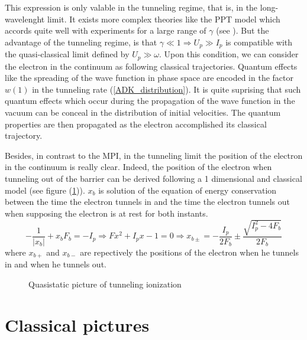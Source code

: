 \documentclass[a4paper]{article}
\begin{document}
\par
This expression is only valable in the tunneling regime, that is, in the long-wavelenght limit. It exists more complex theories like the PPT model which accords quite well with experiments for a large range of $\gamma$ (see \cite{Chin_2004}). But the advantage of the tunneling regime, is that $\gamma \ll 1 \Rightarrow U_{p} \gg I_{p}$ is compatible with the quasi-classical limit defined by $U_{p} \gg \omega$. Upon this condition, we can consider the electron in the continuum as following classical trajectories. Quantum effects like the spreading of the wave function in phase space are encoded in the factor $w(1)$ in the tunneling rate (\ref{ADK_distribution}). It is quite suprising that such quantum effects which occur during the propagation of the wave function in the vacuum can be conceal in the distribution of initial velocities. The quantum properties are then propagated as the electron accomplished its classical trajectory. 
\par
Besides, in contrast to the MPI, in the tunneling limit the position of the electron in the continuum is really clear.
Indeed, the position of the electron when tunneling out of the barrier can be derived following a 1 dimensional and classical model (see figure (\ref{tunneling_ionization})). $x_{b}$ is solution of the equation of energy conservation between the time the electron tunnels in and the time the electron tunnels out when supposing the electron is at rest for both instants.
\begin{equation}
-\frac{1}{| x_{b} |}+x_{b}F_{b}=-I_{p} \Rightarrow Fx^{2}+I_{p}x-1=0 \Rightarrow x_{b\pm}=-\frac{I_{p}}{2F_{b}}\pm\frac{\sqrt{I_{p}^{2}-4F_{b}}}{2F_{b}}
\end{equation} 
where $x_{b+}$ and $x_{b-}$ are repectively the positions of the electron when he tunnels in and when he tunnels out.

\begin{figure}[h] 
\centering
 
 \caption{Quasistatic picture of tunneling ionization}
 \label{tunneling_ionization} 
\end{figure}

\section{Classical pictures}
\end{document}
